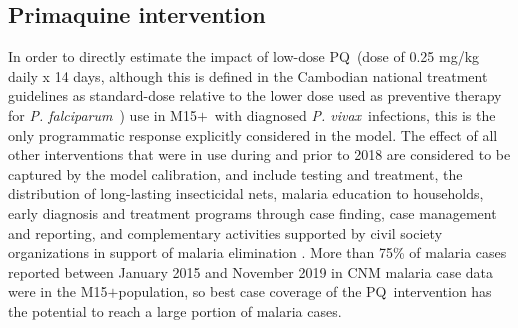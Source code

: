 \documentclass[doublespacing]{bmcart}
\newcommand{\pv}{\textit{P. vivax}}
\newcommand{\pf}{\textit{P. falciparum}}
\newcommand{\males}{M15$+$}
\newcommand{\pq}{PQ}
\begin{document}
\subsection*{Primaquine intervention}
In order to directly estimate the impact of low-dose \pq~(dose of 0.25 mg/kg daily x 14 days, although this is defined in the Cambodian national treatment guidelines as standard-dose relative to the lower dose used as preventive therapy for \pf~\cite{nattreat_guide2014}) use in \males~with diagnosed \pv~infections, this is the only programmatic response explicitly considered in the model. The effect of all other interventions that were in use during and prior to 2018 are considered to be captured by the model calibration, and include testing and treatment, the distribution of long-lasting insecticidal nets, malaria education to households, early diagnosis and treatment programs through case finding, case management and reporting, and complementary activities supported by civil society organizations in support of malaria elimination \cite{cmep_q2_2021}. More than 75\% of malaria cases reported between January 2015 and November 2019 in CNM malaria case data were in the \males population, so best case coverage of the \pq~intervention has the potential to reach a large portion of malaria cases.
\end{document}
